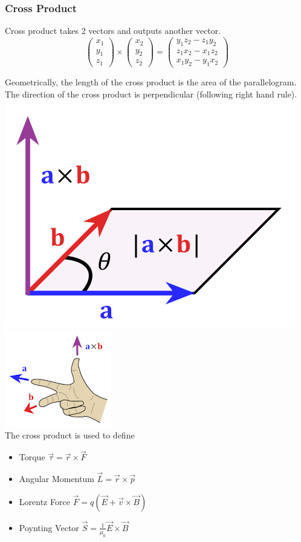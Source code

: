 \documentclass{article}
\begin{document}
\subsubsection{Cross Product}
Cross product takes 2 vectors and outputs another vector.
$$\left(
    \begin{array}{c}  
         x_1 \\
         y_1 \\
         z_1
    \end{array}
    \right) \times \left(
    \begin{array}{c}  
         x_2 \\
         y_2 \\
         z_2
    \end{array} 
    \right) = \left(
    \begin{array}{c}  
         y_1 z_2 - z_1 y_2 \\
         z_1 x_2 - x_1 z_2 \\
         x_1 y_2 - y_1 x_2
    \end{array}
    \right)
$$

Geometrically, the length of the cross product is the area of the parallelogram. The direction of the cross product is perpendicular (following right hand rule). \\
\includegraphics[width=0.49\linewidth]{images/crossproduct.png}
\includegraphics[width=0.49\linewidth]{images/crossproduct2.png}\\
The cross product is used to define 
\begin{itemize}
    \item Torque $\vec{\tau} = \vec{r} \times \vec{F}$
    \item Angular Momentum $\vec{L} = \vec{r} \times \vec{p}$
    \item Lorentz Force $\vec{F} = q(\vec{E} + \vec{v}\times \vec{B})$
    \item Poynting Vector $\vec{S}=\frac{1}{\mu_0} \vec{E} \times \vec{B}$
\end{itemize}
\end{document}
